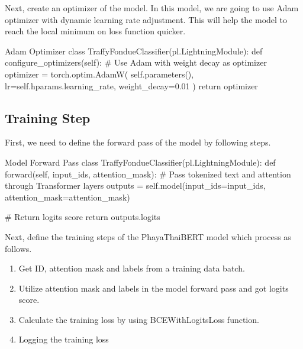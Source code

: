 \documentclass[12pt, a4paper]{article}
\begin{document}
                Next, create an optimizer of the model. In this model, we are going to use Adam optimizer
                with dynamic learning rate adjustment. This will help the model to reach the local minimum on loss function quicker.

                \begin{codeblock}{Adam Optimizer}
                    class TraffyFondueClassifier(pl.LightningModule):
                        def configure_optimizers(self):
                            # Use Adam with weight decay as optimizer
                            optimizer = torch.optim.AdamW(
                                self.parameters(), lr=self.hparams.learning_rate, weight_decay=0.01
                            )
                            return optimizer
                \end{codeblock}

    \pagebreak

            \subsection{Training Step}
                First, we need to define the forward pass of the model by following steps.
                \begin{codeblock}{Model Forward Pass}
                    class TraffyFondueClassifier(pl.LightningModule):
                        def forward(self, input_ids, attention_mask):
                            # Pass tokenized text and attention through Transformer layers
                            outputs = self.model(input_ids=input_ids, attention_mask=attention_mask)

                            # Return logits score
                            return outputs.logits
                \end{codeblock}

                \noindent Next, define the training steps of the PhayaThaiBERT model which process as follows.
                \begin{enumerate}
                    \item Get ID, attention mask and labels from a training data batch.
                    \item Utilize attention mask and labels in the model forward pass and got logits score.
                    \item Calculate the training loss by using BCEWithLogitsLoss function.
                    \item Logging the training loss
                \end{enumerate}
\end{document}
